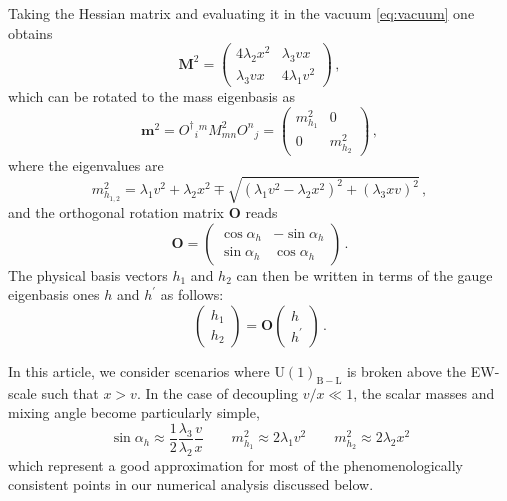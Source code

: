 \documentclass[a4paper,11pt]{article}
\renewcommand{\(}{\left(}
\renewcommand{\)}{\right)}
\renewcommand{\[}{\left[}
\renewcommand{\]}{\right]}
\newcommand{\U}[1]{\mathrm{U}(1)_{\mathrm{#1}}}			%
\begin{document}
Taking the Hessian matrix and evaluating it in the vacuum \eqref{eq:vacuum} one obtains
\begin{equation}
\bm{M}^2 =
\begin{pmatrix}
4 \lambda_2 x^2 & \lambda_3 v x \\ 
\lambda_3 v x   & 4 \lambda_1 v^2 
\end{pmatrix}\,,
\label{eq:hess}
\end{equation}
which can be rotated to the mass eigenbasis as
\begin{equation}
	\bm{m}^2 = {O^\dagger}_{i}{}^{m} M_{mn}^2 O^{n}{}_{j} = 
	\begin{pmatrix}
	m_{h_1}^2 & 0 \\ 
	0   & m_{h_2}^2 
	\end{pmatrix}\,,
\end{equation}
where the eigenvalues are
\begin{equation}
m_{h_{1,2}}^2 = \lambda_1 v^2 + \lambda_2 x^2 \mp \sqrt{(\lambda_1 v^2 - \lambda_2 x^2)^2 + (\lambda_3 x v)^2}\,,
\label{eq:eigvals}
\end{equation}
and the orthogonal rotation matrix $\bm{O}$ reads
\begin{equation}
	\bm{O} = 
	\begin{pmatrix}
	\cos \alpha_h & -\sin \alpha_h \\
	\sin \alpha_h & \cos \alpha_h 
	\end{pmatrix}\,.
	\label{eq:rotmat}
\end{equation}
The physical basis vectors $h_1$ and $h_2$ can then be written in terms of the gauge eigenbasis ones $h$ and $h^\prime$ as follows:
\begin{equation}
	\begin{pmatrix}
	h_1 \\
	h_2 
	\end{pmatrix}
	=
	\bm{O}
	\begin{pmatrix}
	h \\
	h^\prime 
	\end{pmatrix}\,.
	\label{eq:trans}
\end{equation}

In this article, we consider scenarios where $\U{B-L}$ is broken above the EW-scale such that $x > v$. 
In the case of decoupling $v/x\ll 1$, the scalar masses and mixing angle become particularly simple,
\begin{equation}
\sin \alpha_h \approx \dfrac{1}{2}\dfrac{\lambda_3}{\lambda_2} \dfrac{v}{x} \qquad
m_{h_1}^2 \approx 2 \lambda_1 v^2 \qquad m_{h_2}^2 \approx 2 \lambda_2 x^2
\label{eq:simplify}
\end{equation}
which represent a good approximation for most of the phenomenologically consistent points 
in our numerical analysis discussed below.
\end{document}
